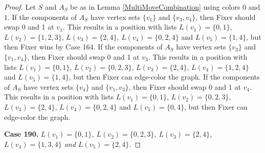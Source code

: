 \documentclass[12pt]{amsart}
\theoremstyle{plain}
\theoremstyle{definition}
\theoremstyle{remark}
\begin{document}
\begin{proof}
Let $S$ and $A_S$ be as in Lemma \ref{MultiMoveCombination} using colors $0$ and $1$. If the components of $A_S$ have vertex sets $\{v_1\}$ and $\{v_3, v_4\}$, then Fixer should swap 0 and 1 at $v_1$. This results in a position with lists $L(v_1) = \{0, 1\}$, $L(v_2) = \{1, 2, 3\}$, $L(v_3) = \{2, 4\}$, $L(v_4) = \{0, 2, 4\}$ and $L(v_5) = \{1, 4\}$, but then Fixer wins by Case 164.
If the components of $A_S$ have vertex sets $\{v_3\}$ and $\{v_1, v_4\}$, then Fixer should swap 0 and 1 at $v_3$. This results in a position with lists $L(v_1) = \{0, 1\}$, $L(v_2) = \{0, 2, 3\}$, $L(v_3) = \{2, 4\}$, $L(v_4) = \{1, 2, 4\}$ and $L(v_5) = \{1, 4\}$, but then Fixer can edge-color the graph.
If the components of $A_S$ have vertex sets $\{v_4\}$ and $\{v_1, v_3\}$, then Fixer should swap 0 and 1 at $v_4$. This results in a position with lists $L(v_1) = \{0, 1\}$, $L(v_2) = \{0, 2, 3\}$, $L(v_3) = \{2, 4\}$, $L(v_4) = \{0, 2, 4\}$ and $L(v_5) = \{0, 4\}$, but then Fixer can edge-color the graph.

\noindent\textbf{Case 190.  }\textit{$L(v_1) = \{0, 1\}$, $L(v_2) = \{0, 2, 3\}$, $L(v_3) = \{2, 4\}$, $L(v_4) = \{1, 3, 4\}$ and $L(v_5) = \{2, 4\}$.}


\end{proof}
\end{document}
